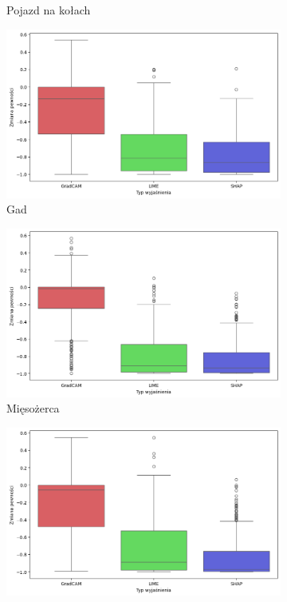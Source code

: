 \begin{figure}[h]
\begin{subfigure}[b]{0.3\textwidth}
		\caption{Pojazd na kołach}  \label{rys:base_confidence_exp_vehicle}
	\end{subfigure}
	\begin{subfigure}[b]{0.3\textwidth}
		\centering\includegraphics[width=.9\textwidth]{img/base_confidence_exp_reptile}
		\caption{Gad}  \label{rys:base_confidence_exp_reptile}
	\end{subfigure}
	\begin{subfigure}[b]{0.3\textwidth}
		\centering\includegraphics[width=.9\textwidth]{img/base_confidence_exp_carnivore}
		\caption{Mięsożerca}  \label{rys:base_confidence_exp_carnivore}
	\end{subfigure}
	\begin{subfigure}[b]{0.3\textwidth}
		\centering\includegraphics[width=.9\textwidth]{img/base_confidence_exp_insect}

\end{subfigure}
\end{figure}
